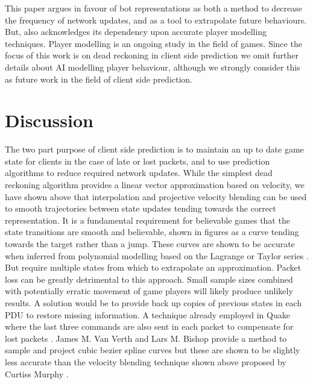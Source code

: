 \documentclass[journal]{IEEEtran}
\begin{document}
This paper argues in favour of bot representations as both a method to decrease the frequency of network updates, and as a tool to extrapolate future behaviours. But, also acknowledges its dependency upon accurate player modelling techniques. Player modelling is an ongoing study in the field of games. Since the focus of this work is on dead reckoning in client side prediction we omit further details about AI modelling player behaviour, although we strongly consider this as future work in the field of client side prediction.

\section{Discussion}

The two part purpose of client side prediction is to maintain an up to date game state for clients in the case of late or lost packets, and to use prediction algorithms to reduce required network updates. While the simplest dead reckoning algorithm provides a linear vector approximation based on velocity, we have shown above that interpolation and projective velocity blending can be used to smooth trajectories between state updates tending towards the correct representation. It is a fundamental requirement for believable games that the state transitions are smooth and believable, shown in figures as a curve tending towards the target rather than a jump. These curves are shown to be accurate when inferred from polynomial modelling based on the Lagrange or Taylor series \cite{hanawa2006proposal}. But require multiple states from which to extrapolate an approximation. Packet loss can be greatly detrimental to this approach. Small sample sizes combined with potentially erratic movement of game players will likely produce unlikely results. A solution would be to provide back up copies of previous states in each PDU to restore missing information. A technique already employed in Quake where the last three commands are also sent in each packet to compensate for lost packets \cite{cronin2001distributed}. James M. Van Verth and Lars M. Bishop provide a method to sample and project cubic bezier spline curves \cite{van2008essential} but these are shown to be slightly less accurate than the velocity blending technique shown above proposed by Curtiss Murphy \cite{murphy2011believable}. 
\end{document}
